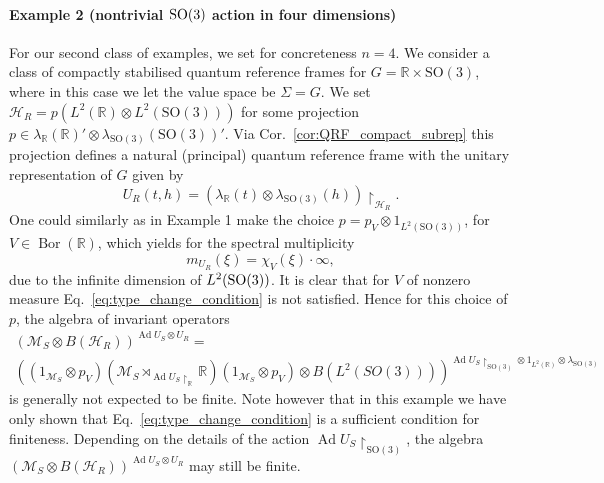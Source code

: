 \documentclass[sn-mathphys-num]{sn-jnl}%
\newcommand{\RR}{\mathbb{R}}
\newcommand{\HH}{\mathcal{H}}
\newcommand{\MM}{\mathcal{M}}
\DeclareMathOperator{\Bor}{Bor}
\DeclareMathOperator{\Ad}{Ad}
\numberwithin{equation}{section}
\theoremstyle{thmstyleone}%
\theoremstyle{thmstyletwo}%
\theoremstyle{thmstylethree}%
\begin{document}
\paragraph{Example 2 (nontrivial $\textnormal{SO}(3)$ action in four dimensions)} For our second class of examples, we set for concreteness $n=4$. We consider a class of compactly stabilised quantum reference frames for $G=\RR\times \mathrm{SO}(3)$, where in this case we let the value space be $\Sigma=G$. We set $\HH_R=p(L^2(\RR)\otimes L^2(\mathrm{SO}(3)))$ for some projection $p\in \lambda_\RR(\RR)'\otimes\lambda_{\mathrm{SO}(3)}(\mathrm{SO}(3))'$. Via Cor.\ \ref{cor:QRF_compact_subrep} this projection defines a natural (principal) quantum reference frame with the unitary representation of $G$ given by 
\begin{equation}
    U_R(t,h)=\left(\lambda_\RR(t)\otimes\lambda_{\mathrm{SO}(3)}(h)\right)\restriction_{\HH_R}.
\end{equation} One could similarly as in Example 1 make the choice $p=p_V\otimes 1_{L^2(\mathrm{SO}(3))}$, for $V\in\Bor(\RR)$, which yields for the spectral multiplicity 
\begin{equation}
    m_{U_R}(\xi)=\chi_V(\xi)\cdot\infty,
\end{equation}
due to the infinite dimension of $L^2(\textnormal{SO}(3))$.
It is clear that for $V$ of nonzero measure Eq.\ \eqref{eq:type_change_condition} is not satisfied. Hence for this choice of $p$, the algebra of invariant operators
\begin{multline}
    (\MM_S\otimes B(\HH_R))^{\Ad U_S\otimes U_R}=\\\left((1_{\MM_S}\otimes p_V)(\MM_S\rtimes_{\Ad U_S\restriction_\RR}\RR)(1_{\MM_S}\otimes p_V)\otimes B(L^2(SO(3)))\right)^{\Ad U_S\restriction_{\mathrm{SO}(3)}\otimes 1_{L^2(\RR)}\otimes \lambda_{\mathrm{SO}(3)}}
\end{multline}
is generally not expected to be finite. Note however that in this example we have only shown that Eq.\ \eqref{eq:type_change_condition} is a sufficient condition for finiteness. Depending on the details of the action $\Ad U_S\restriction_{\mathrm{SO}(3)}$, the algebra $(\MM_S\otimes B(\HH_R))^{\Ad U_S\otimes U_R}$ may still be finite. 
\end{document}

